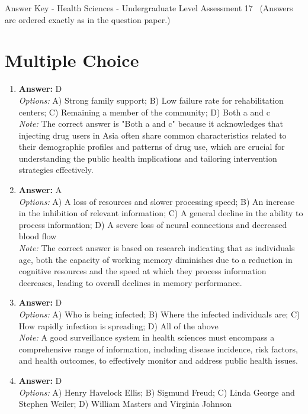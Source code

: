 \documentclass[12pt]{article}
\begin{document}
\begin{center}
Answer Key - Health Sciences - Undergraduate Level Assessment 17 \
\small (Answers are ordered exactly as in the question paper.)
\end{center}

\section*{Multiple Choice}
\begin{enumerate}[label=\arabic*.]
\item \textbf{Answer:} D
\\ \textit{Options:} A) Strong family support; B) Low failure rate for rehabilitation centers; C) Remaining a member of the community; D) Both a and c
\\ \textit{Note:} The correct answer is "Both a and c" because it acknowledges that injecting drug users in Asia often share common characteristics related to their demographic profiles and patterns of drug use, which are crucial for understanding the public health implications and tailoring intervention strategies effectively.
\item \textbf{Answer:} A
\\ \textit{Options:} A) A loss of resources and slower processing speed; B) An increase in the inhibition of relevant information; C) A general decline in the ability to process information; D) A severe loss of neural connections and decreased blood flow
\\ \textit{Note:} The correct answer is based on research indicating that as individuals age, both the capacity of working memory diminishes due to a reduction in cognitive resources and the speed at which they process information decreases, leading to overall declines in memory performance.
\item \textbf{Answer:} D
\\ \textit{Options:} A) Who is being infected; B) Where the infected individuals are; C) How rapidly infection is spreading; D) All of the above
\\ \textit{Note:} A good surveillance system in health sciences must encompass a comprehensive range of information, including disease incidence, risk factors, and health outcomes, to effectively monitor and address public health issues.
\item \textbf{Answer:} D
\\ \textit{Options:} A) Henry Havelock Ellis; B) Sigmund Freud; C) Linda George and Stephen Weiler; D) William Masters and Virginia Johnson

\end{enumerate}
\end{document}
